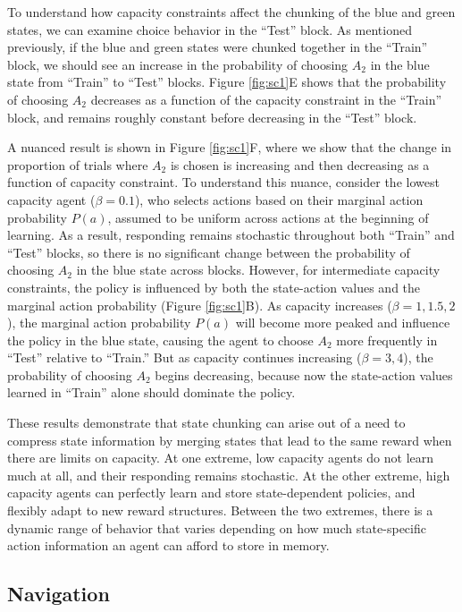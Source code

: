 \documentclass[11pt]{article}
\begin{document}
To understand how capacity constraints affect the chunking of the blue and green states, we can examine choice behavior in the ``Test'' block. As mentioned previously, if the blue and green states were chunked together in the ``Train'' block, we should see an increase in the probability of choosing $A_2$ in the blue state from ``Train” to ``Test'' blocks. Figure \ref{fig:sc1}E shows that the probability of choosing $A_2$ decreases as a function of the capacity constraint in the ``Train'' block, and remains roughly constant before decreasing in the ``Test'' block.

A nuanced result is shown in Figure \ref{fig:sc1}F, where we show that the change in proportion of trials where $A_2$ is chosen is increasing and then decreasing as a function of capacity constraint. To understand this nuance, consider the lowest capacity agent ($\beta = 0.1$), who selects actions based on their marginal action probability $P(a)$, assumed to be uniform across actions at the beginning of learning. As a result, responding remains stochastic throughout both ``Train'' and ``Test'' blocks, so there is no significant change between the probability of choosing $A_2$ in the blue state across blocks. However, for intermediate capacity constraints, the policy is influenced by both the state-action values and the marginal action probability (Figure \ref{fig:sc1}B). As capacity increases ($\beta = 1, 1.5, 2$), the marginal action probability $P(a)$ will become more peaked and influence the policy in the blue state, causing the agent to choose $A_2$ more frequently in ``Test'' relative to ``Train.'' But as capacity continues increasing ($\beta  = 3, 4$), the probability of choosing $A_2$ begins decreasing, because now the state-action values learned in ``Train'' alone should dominate the policy.

These results demonstrate that state chunking can arise out of a need to compress state information by merging states that lead to the same reward when there are limits on capacity. At one extreme, low capacity agents do not learn much at all, and their responding remains stochastic. At the other extreme, high capacity agents can perfectly learn and store state-dependent policies, and flexibly adapt to new reward structures. Between the two extremes, there is a dynamic range of behavior that varies depending on how much state-specific action information an agent can afford to store in memory.

 \subsection{Navigation}
 
\end{document}
